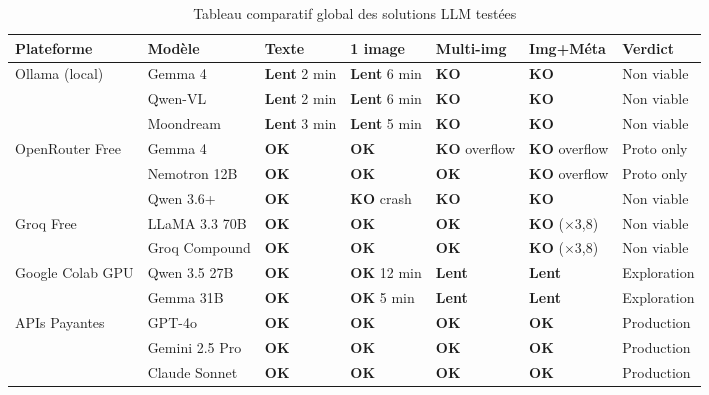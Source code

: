 \begin{table}[H]
  \centering
  \caption{Tableau comparatif global des solutions LLM testées}
  \label{tab:comparaison-llm-global}
  \scriptsize
  \begin{tabular}{|p{2.1cm}|p{1.8cm}|p{1.2cm}|p{1.2cm}|p{1.4cm}|p{1.4cm}|p{1.8cm}|}
    \hline
    \textbf{Plateforme} & \textbf{Modèle} & \textbf{Texte} & \textbf{1 image} & \textbf{Multi-img} & \textbf{Img+Méta} & \textbf{Verdict} \\
    \hline
    \multirow{3}{*}{Ollama (local)} & Gemma 4       & \textbf{Lent} 2 min  & \textbf{Lent} 6 min  & \textbf{KO}       & \textbf{KO}       & \cellcolor{red!20}Non viable \\
                    & Qwen-VL       & \textbf{Lent} 2 min  & \textbf{Lent} 6 min  & \textbf{KO}       & \textbf{KO}       & \cellcolor{red!20}Non viable \\
                    & Moondream     & \textbf{Lent} 3 min  & \textbf{Lent} 5 min  & \textbf{KO}       & \textbf{KO}       & \cellcolor{red!20}Non viable \\
    \hline
    \multirow{3}{*}{OpenRouter Free} & Gemma 4      & \textbf{OK} & \textbf{OK} & \textbf{KO} overflow & \textbf{KO} overflow & \cellcolor{yellow!30}Proto only \\
                     & Nemotron 12B & \textbf{OK} & \textbf{OK} & \textbf{OK} & \textbf{KO} overflow & \cellcolor{yellow!30}Proto only \\
                     & Qwen 3.6+    & \textbf{OK} & \textbf{KO} crash & \textbf{KO} & \textbf{KO} & \cellcolor{red!20}Non viable \\
    \hline
    \multirow{2}{*}{Groq Free} & LLaMA 3.3 70B & \textbf{OK} & \textbf{OK} & \textbf{OK} & \textbf{KO} ($\times$3,8) & \cellcolor{red!20}Non viable \\
                   & Groq Compound & \textbf{OK} & \textbf{OK} & \textbf{OK} & \textbf{KO} ($\times$3,8) & \cellcolor{red!20}Non viable \\
    \hline
    \multirow{2}{*}{Google Colab GPU} & Qwen 3.5 27B & \textbf{OK} & \textbf{OK} 12 min & \textbf{Lent} & \textbf{Lent} & \cellcolor{orange!20}Exploration \\
                      & Gemma 31B    & \textbf{OK} & \textbf{OK} 5 min  & \textbf{Lent} & \textbf{Lent} & \cellcolor{orange!20}Exploration \\
    \hline
    \multirow{3}{*}{APIs Payantes} & GPT-4o        & \textbf{OK} & \textbf{OK} & \textbf{OK} & \textbf{OK} & \cellcolor{green!20}Production \\
                     & Gemini 2.5 Pro & \textbf{OK} & \textbf{OK} & \textbf{OK} & \textbf{OK} & \cellcolor{green!20}Production \\
                     & Claude Sonnet  & \textbf{OK} & \textbf{OK} & \textbf{OK} & \textbf{OK} & \cellcolor{green!20}Production \\
    \hline
  \end{tabular}
\end{table}

